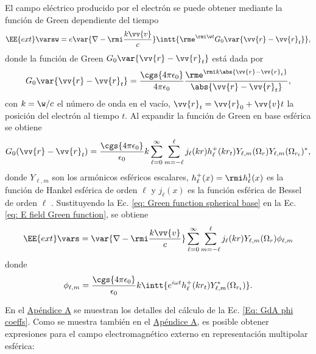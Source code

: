 El campo eléctrico producido por el electrón se puede obtener mediante la función de Green dependiente del tiempo \cite{maciel2019electromagnetic}  
\begin{equation}
\EE{ext}\varsw = e\var{\nabla-\rmi \frac{k\vv{v}}{c}} \intt{\rme^{\rmi \w t} G_0 \var{\vv{r}-\vv{r}_t}},
\label{eq: E field Green function}
\end{equation}
donde la función de Green $G_0 \var{\vv{r}-\vv{r}_t}$ está dada por 
\begin{equation}
G_0 \var{\vv{r}-\vv{r}_t} = \frac{\cgs{4\pi\epsilon_0}}{4\pi\epsilon_0}\frac{\rme^{\rmi k \abs{\vv{r}-\vv{r}_t}}}{\abs{\vv{r}-\vv{r}_t}},
\end{equation}
con $k = \w/c$ el número de onda en el vacío, $\vv{r}_t=\vv{r}_0+\vv{v}t$ la posición del electrón al tiempo $t$. Al expandir la función de Green en base esférica se obtiene \cite{de1999relativistic}
\begin{equation}
G_0(\vv{r}-\vv{r}_t) = \frac{\cgs{4\pi\epsilon_0}}{\epsilon_0} k \sum_{\ell = 0}^{\infty} \sum_{m=-\ell}^{\ell} j_{\ell}(kr) h_{\ell}^{+}(k r_t) Y_{\ell, m}(\Omega_r) Y_{\ell, m}(\Omega_{r_t})^{*},
\label{eq: Green function spherical base}
\end{equation}
donde $Y_{\ell,m}$ son los armónicos esféricos escalares, $h_{\ell}^{+}(x) = \rmi h_{\ell}^{1}(x)$ es la función de Hankel esférica de orden $\ell$ y $j_{\ell}(x)$ es la función esférica de Bessel de orden $\ell$ \citep{Abramowitz}. Sustituyendo la Ec. \eqref{eq: Green function spherical base} en la Ec. \eqref{eq: E field Green function}, se obtiene
\begin{equation}
\EE{ext}\vars = \var{\nabla-\rmi \frac{k\vv{v}}{c}} \sum_{\ell = 0}^{\infty} \sum_{m=-\ell}^{\ell} j_{\ell}(kr) Y_{\ell, m}(\Omega_{r})\phi_{\ell, m}
\end{equation}
donde 
\begin{equation}
\phi_{\ell, m} = \frac{\cgs{4\pi\epsilon_0}}{\epsilon_0} k \intt{e^{i \omega t} h_{\ell}^{+}(k r_{t}) Y_{\ell, m}^{*}(\Omega_{r_t}) }.
\label{Eq: GdA phi coeffs}
\end{equation}

En el \hyperref[AppendixScalarPotentials]{Apéndice A} se muestran los detalles del cálculo de la Ec. \eqref{Eq: GdA phi coeffs}. Como se muestra también en el \hyperref[AppendixScalarPotentials]{Apéndice A}, es posible obtener expresiones para el campo electromagnético externo en representación multipolar esférica:


